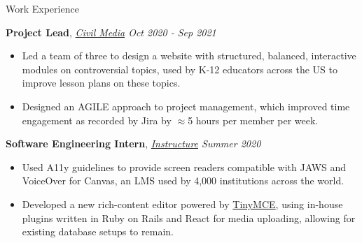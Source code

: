 \documentclass{resume}
\begin{document}
\begin{rSection}{Work Experience}
    
    {\bf Project Lead}, {\em \href{https://civilmedia.webflow.io/}{Civil Media} \hfill Oct 2020 - Sep 2021}
    \vspace{-6pt}
    \begin{itemize}[nosep]
        \item Led a team of three to design a website with structured, balanced, interactive modules on controversial topics, used by K-12 educators across the US to improve lesson plans on these topics.
        \item Designed an AGILE approach to project management, which improved time engagement as recorded by Jira by $\approx$5 hours per member per week.
    \end{itemize}


    {\bf Software Engineering Intern}, {\em \href{https://www.instructure.com/}{Instructure} \hfill Summer 2020}
    \vspace{-6pt}
    \begin{itemize}[nosep]
        \item Used A11y guidelines to provide screen readers compatible with JAWS and VoiceOver for Canvas, an LMS used by 4,000 institutions across the world.
        \item Developed a new rich-content editor powered by \href{https://www.tiny.cloud/}{TinyMCE}, using in-house plugins written in Ruby on Rails and React for media uploading, allowing for existing database setups to remain.
    \end{itemize}
    

\end{rSection}
\end{document}
